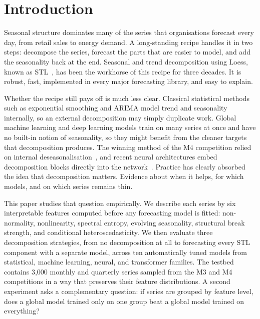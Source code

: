 \documentclass[pdflatex,sn-mathphys-num]{sn-jnl}
\theoremstyle{thmstyleone}
\theoremstyle{thmstyletwo}
\theoremstyle{thmstylethree}
\begin{document}
\section{Introduction}\label{sec:intro}

Seasonal structure dominates many of the series that organisations forecast
every day, from retail sales to energy demand. A long-standing recipe handles
it in two steps: decompose the series, forecast the parts that are easier to
model, and add the seasonality back at the end. Seasonal and trend
decomposition using Loess, known as STL~\cite{cleveland1990stl}, has been the
workhorse of this recipe for three decades. It is robust, fast, implemented in
every major forecasting library, and easy to explain.

Whether the recipe still pays off is much less clear. Classical statistical
methods such as exponential smoothing and ARIMA model trend and seasonality
internally, so an external decomposition may simply duplicate work. Global
machine learning and deep learning models train on many series at once and
have no built-in notion of seasonality, so they might benefit from the cleaner
targets that decomposition produces. The winning method of the M4 competition
relied on internal deseasonalisation~\cite{smyl2020hybrid}, and recent neural
architectures embed decomposition blocks directly into the
network~\cite{wu2021autoformer, zeng2023dlinear}. Practice has clearly
absorbed the idea that decomposition matters. Evidence about when it helps,
for which models, and on which series remains thin.

This paper studies that question empirically. We describe each series by six
interpretable features computed before any forecasting model is fitted:
non-normality, nonlinearity, spectral entropy, evolving seasonality,
structural break strength, and conditional heteroscedasticity. We then
evaluate three decomposition strategies, from no decomposition at all to
forecasting every STL component with a separate model, across ten
automatically tuned models from statistical, machine learning, neural, and
transformer families. The testbed contains 3{,}000 monthly and quarterly
series sampled from the M3 and M4 competitions in a way that preserves their
feature distributions. A second experiment asks a complementary question: if
series are grouped by feature level, does a global model trained only on one
group beat a global model trained on everything?
\end{document}
